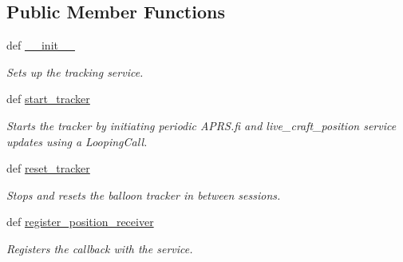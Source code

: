 \subsection*{Public Member Functions}
\begin{DoxyCompactItemize}
\item 
def \hyperlink{classhwm_1_1hardware_1_1devices_1_1drivers_1_1mxl__balloon__tracker_1_1mxl__balloon__tracker_1_1e3a9bc8b0b4bc235d39c93a5b84975bc_a92f74687152783e6ee048b7ecb6e49e2}{\-\_\-\-\_\-init\-\_\-\-\_\-}
\begin{DoxyCompactList}\small\item\em Sets up the tracking service. \end{DoxyCompactList}\item 
def \hyperlink{classhwm_1_1hardware_1_1devices_1_1drivers_1_1mxl__balloon__tracker_1_1mxl__balloon__tracker_1_1e3a9bc8b0b4bc235d39c93a5b84975bc_a404b88d4cc150f5ce26f6697a0a2ed0f}{start\-\_\-tracker}
\begin{DoxyCompactList}\small\item\em Starts the tracker by initiating periodic A\-P\-R\-S.\-fi and live\-\_\-craft\-\_\-position service updates using a Looping\-Call. \end{DoxyCompactList}\item 
\hypertarget{classhwm_1_1hardware_1_1devices_1_1drivers_1_1mxl__balloon__tracker_1_1mxl__balloon__tracker_1_1e3a9bc8b0b4bc235d39c93a5b84975bc_a2f4ab21610e4dc68dd2b21cea8a41e2a}{def \hyperlink{classhwm_1_1hardware_1_1devices_1_1drivers_1_1mxl__balloon__tracker_1_1mxl__balloon__tracker_1_1e3a9bc8b0b4bc235d39c93a5b84975bc_a2f4ab21610e4dc68dd2b21cea8a41e2a}{reset\-\_\-tracker}}\label{classhwm_1_1hardware_1_1devices_1_1drivers_1_1mxl__balloon__tracker_1_1mxl__balloon__tracker_1_1e3a9bc8b0b4bc235d39c93a5b84975bc_a2f4ab21610e4dc68dd2b21cea8a41e2a}

\begin{DoxyCompactList}\small\item\em Stops and resets the balloon tracker in between sessions. \end{DoxyCompactList}\item 
def \hyperlink{classhwm_1_1hardware_1_1devices_1_1drivers_1_1mxl__balloon__tracker_1_1mxl__balloon__tracker_1_1e3a9bc8b0b4bc235d39c93a5b84975bc_a1b46aa40ddc72b4f4ea8d3318a349129}{register\-\_\-position\-\_\-receiver}
\begin{DoxyCompactList}\small\item\em Registers the callback with the service. \end{DoxyCompactList}\end{DoxyCompactItemize}
